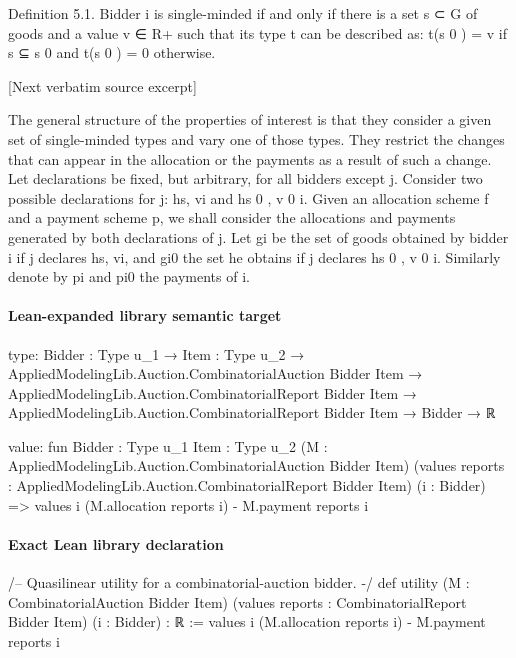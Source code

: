 \documentclass[10pt]{article}
\begin{document}
\begin{ReviewVerbatim}

Definition 5.1. Bidder i is single-minded if and only if there is a set s ⊂ G of
goods and a value v ∈ R+ such that its type t can be described as: t(s 0 ) = v if s ⊆ s 0
and t(s 0 ) = 0 otherwise.

[Next verbatim source excerpt]

The general structure of the properties of interest is that they consider a given
set of single-minded types and vary one of those types. They restrict the changes
that can appear in the allocation or the payments as a result of such a change.
Let declarations be fixed, but arbitrary, for all bidders except j. Consider two
possible declarations for j: hs, vi and hs 0 , v 0 i. Given an allocation scheme f and a
payment scheme p, we shall consider the allocations and payments generated by
both declarations of j. Let gi be the set of goods obtained by bidder i if j declares
hs, vi, and gi0 the set he obtains if j declares hs 0 , v 0 i. Similarly denote by pi and pi0
the payments of i.
\end{ReviewVerbatim}



\paragraph{Lean-expanded library semantic target}
\begin{ReviewVerbatim}
type:
{Bidder : Type u_1} →
  {Item : Type u_2} →
    AppliedModelingLib.Auction.CombinatorialAuction Bidder Item →
      AppliedModelingLib.Auction.CombinatorialReport Bidder Item →
        AppliedModelingLib.Auction.CombinatorialReport Bidder Item → Bidder → ℝ

value:
fun {Bidder : Type u_1} {Item : Type u_2} (M : AppliedModelingLib.Auction.CombinatorialAuction Bidder Item)
    (values reports : AppliedModelingLib.Auction.CombinatorialReport Bidder Item) (i : Bidder) =>
  values i (M.allocation reports i) - M.payment reports i
\end{ReviewVerbatim}

\paragraph{Exact Lean library declaration}
\begin{ReviewVerbatim}
/-- Quasilinear utility for a combinatorial-auction bidder. -/
def utility (M : CombinatorialAuction Bidder Item)
    (values reports : CombinatorialReport Bidder Item) (i : Bidder) : ℝ :=
  values i (M.allocation reports i) - M.payment reports i
\end{ReviewVerbatim}
\end{document}
